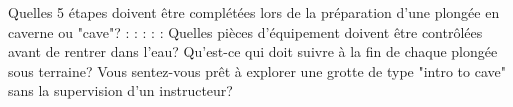 \documentclass[english,10pt,a4paper]{article}
\begin{document}
\begin{outline}
			\vspace{2cm}
		\1 Quelles 5 étapes doivent être complétées lors de la préparation d’une plongée en caverne ou "cave"?
			:
			:
			:
			:
			:
		\1 Quelles pièces d’équipement doivent être contrôlées avant de rentrer dans l’eau?
			\vspace{2cm}
		\1 Qu’est-ce qui doit suivre à la fin de chaque plongée sous terraine?
			\vspace{2cm}
		\1 Vous sentez-vous prêt à explorer une grotte de type "intro to cave" sans la supervision d’un instructeur?
			\vspace{2cm}
	\end{outline}
\end{document}
